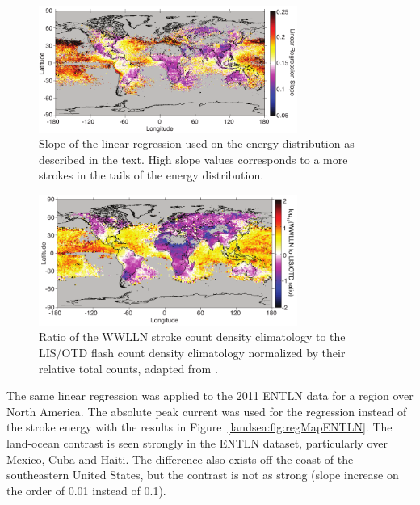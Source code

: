 \begin{figure}[ht!]
   \centering
   \noindent\includegraphics[width=20pc]{LandSea/Figures/2_regMap.pdf} 
   \caption{Slope of the linear regression used on the energy distribution as described in the text. 
      High slope values corresponds to a more strokes in the tails of the energy distribution.}
   \label{landsea:fig:regMap}
\end{figure}

\begin{figure}[ht!]
   \centering
   \noindent\includegraphics[width=20pc]{LandSea/Figures/3_lisMap.pdf} 
   \caption{Ratio of the WWLLN stroke count density climatology to the LIS/OTD flash count density climatology normalized by their relative total counts, adapted from \citet{Virts2013}.}
   \label{landsea:fig:virts}
\end{figure}

The same linear regression was applied to the 2011 ENTLN data for a region over North America.
The absolute peak current was used for the regression instead of the stroke energy with the results in Figure~\ref{landsea:fig:regMapENTLN}.
The land-ocean contrast is seen strongly in the ENTLN dataset, particularly over Mexico, Cuba and Haiti.
The difference also exists off the coast of the southeastern United States, but the contrast is not as strong (slope increase on the order of 0.01 instead of 0.1).

